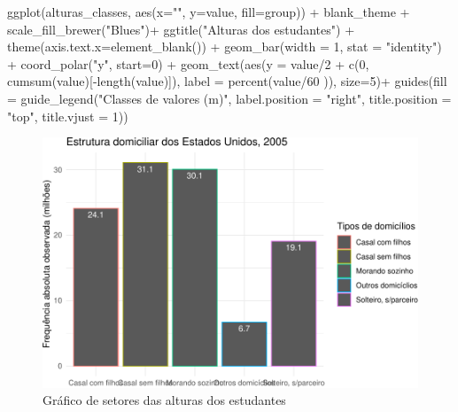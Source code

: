 \documentclass[
]{book}
\newenvironment{Shaded}{\begin{snugshade}}{\end{snugshade}}
\newcommand{\AttributeTok}[1]{\textcolor[rgb]{0.77,0.63,0.00}{#1}}
\newcommand{\DecValTok}[1]{\textcolor[rgb]{0.00,0.00,0.81}{#1}}
\newcommand{\FunctionTok}[1]{\textcolor[rgb]{0.00,0.00,0.00}{#1}}
\newcommand{\NormalTok}[1]{#1}
\newcommand{\SpecialCharTok}[1]{\textcolor[rgb]{0.00,0.00,0.00}{#1}}
\newcommand{\StringTok}[1]{\textcolor[rgb]{0.31,0.60,0.02}{#1}}
\begin{document}
\begin{Shaded}
\begin{Highlighting}[]
\FunctionTok{ggplot}\NormalTok{(alturas\_classes, }\FunctionTok{aes}\NormalTok{(}\AttributeTok{x=}\StringTok{""}\NormalTok{, }\AttributeTok{y=}\NormalTok{value, }\AttributeTok{fill=}\NormalTok{group)) }\SpecialCharTok{+}
\NormalTok{  blank\_theme }\SpecialCharTok{+}
  \FunctionTok{scale\_fill\_brewer}\NormalTok{(}\StringTok{"Blues"}\NormalTok{)}\SpecialCharTok{+}
  \FunctionTok{ggtitle}\NormalTok{(}\StringTok{"Alturas dos estudantes"}\NormalTok{) }\SpecialCharTok{+}
  \FunctionTok{theme}\NormalTok{(}\AttributeTok{axis.text.x=}\FunctionTok{element\_blank}\NormalTok{()) }\SpecialCharTok{+}
  \FunctionTok{geom\_bar}\NormalTok{(}\AttributeTok{width =} \DecValTok{1}\NormalTok{, }\AttributeTok{stat =} \StringTok{"identity"}\NormalTok{) }\SpecialCharTok{+}
  \FunctionTok{coord\_polar}\NormalTok{(}\StringTok{"y"}\NormalTok{, }\AttributeTok{start=}\DecValTok{0}\NormalTok{) }\SpecialCharTok{+}
  \FunctionTok{geom\_text}\NormalTok{(}\FunctionTok{aes}\NormalTok{(}\AttributeTok{y =}\NormalTok{ value}\SpecialCharTok{/}\DecValTok{2} \SpecialCharTok{+} \FunctionTok{c}\NormalTok{(}\DecValTok{0}\NormalTok{, }\FunctionTok{cumsum}\NormalTok{(value)[}\SpecialCharTok{{-}}\FunctionTok{length}\NormalTok{(value)]),}
                \AttributeTok{label =} \FunctionTok{percent}\NormalTok{(value}\SpecialCharTok{/}\DecValTok{60}\NormalTok{ )), }\AttributeTok{size=}\DecValTok{5}\NormalTok{)}\SpecialCharTok{+}
  \FunctionTok{guides}\NormalTok{(}\AttributeTok{fill =} \FunctionTok{guide\_legend}\NormalTok{(}\StringTok{"Classes de valores (m)"}\NormalTok{,}
                             \AttributeTok{label.position =} \StringTok{"right"}\NormalTok{,}
                             \AttributeTok{title.position =} \StringTok{"top"}\NormalTok{, }\AttributeTok{title.vjust =} \DecValTok{1}\NormalTok{)) }
\end{Highlighting}
\end{Shaded}

\begin{figure}
\centering
\includegraphics{apostila_files/figure-latex/unnamed-chunk-51-1.pdf}
\caption{\label{fig:unnamed-chunk-51}Gráfico de setores das alturas dos estudantes}
\end{figure}
\end{document}
